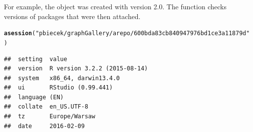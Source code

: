 \documentclass[nojss]{jss}\usepackage[]{graphicx}\usepackage[]{color}
\makeatletter
\newcommand{\hlstr}[1]{\textcolor[rgb]{0.192,0.494,0.8}{#1}}%
\newcommand{\hlstd}[1]{\textcolor[rgb]{0.345,0.345,0.345}{#1}}%
\newcommand{\hlkwd}[1]{\textcolor[rgb]{0.737,0.353,0.396}{\textbf{#1}}}%
\newenvironment{kframe}{%
 \def\at@end@of@kframe{}%
 \ifinner\ifhmode%
  \def\at@end@of@kframe{\end{minipage}}%
  \begin{minipage}{\columnwidth}%
 \fi\fi%
 \def\FrameCommand##1{\hskip\@totalleftmargin \hskip-\fboxsep
 \colorbox{shadecolor}{##1}\hskip-\fboxsep
     \hskip-\linewidth \hskip-\@totalleftmargin \hskip\columnwidth}%
 \MakeFramed {\advance\hsize-\width
   \@totalleftmargin\z@ \linewidth\hsize
   \@setminipage}}%
 {\par\unskip\endMakeFramed%
 \at@end@of@kframe}
\newenvironment{knitrout}{}{} %
\makeatother
\begin{document}
For example, the  object was created with  version 2.0. The  function checks versions of packages that were then attached.

\begin{knitrout}
\color{fgcolor}\begin{kframe}
\begin{alltt}
\hlkwd{asession}\hlstd{(}\hlstr{"pbiecek/graphGallery/arepo/600bda83cb840947976bd1ce3a11879d"}\hlstd{)}
\end{alltt}


{\ttfamily\noindent\itshape\color{messagecolor}{\#\# Session info --------------------------------------------------------------}}\begin{verbatim}
##  setting  value                       
##  version  R version 3.2.2 (2015-08-14)
##  system   x86_64, darwin13.4.0        
##  ui       RStudio (0.99.441)          
##  language (EN)                        
##  collate  en_US.UTF-8                 
##  tz       Europe/Warsaw               
##  date     2016-02-09
\end{verbatim}



\end{kframe}
\end{knitrout}
\end{document}
